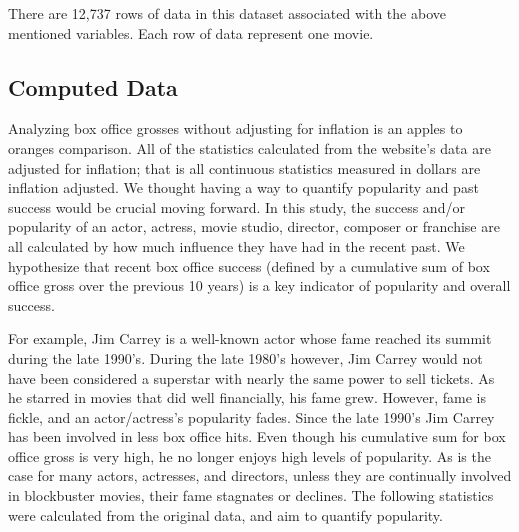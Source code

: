\documentclass{svproc}
\begin{document}
There are 12,737 rows of data in this dataset associated with the above mentioned variables. Each row of data represent one movie.

\newpage
\subsection{Computed Data}

Analyzing box office grosses without adjusting for inflation is an apples to oranges comparison. All of the statistics calculated from the website's data are adjusted for inflation; that is all continuous statistics measured in dollars are inflation adjusted. We thought having a way to quantify popularity and past success would be crucial moving forward. In this study, the success and/or popularity of an actor, actress, movie studio, director, composer or franchise are all calculated by how much influence they have had in the recent past. We hypothesize that recent box office success (defined by a cumulative sum of box office gross over the previous 10 years) is a key indicator of popularity and overall success.

For example, Jim Carrey is a well-known actor whose fame reached its summit during the late 1990's. During the late 1980's however, Jim Carrey would not have been considered a superstar with nearly the same power to sell tickets. As he starred in movies that did well financially, his fame grew. However, fame is fickle, and an actor/actress's popularity fades. Since the late 1990's Jim Carrey has been involved in less box office hits. Even though his cumulative sum for box office gross is very high, he no longer enjoys high levels of popularity. As is the case for many actors, actresses, and directors, unless they are continually involved in blockbuster movies, their fame stagnates or declines. The following statistics were calculated from the original data, and aim to quantify popularity.
\end{document}
